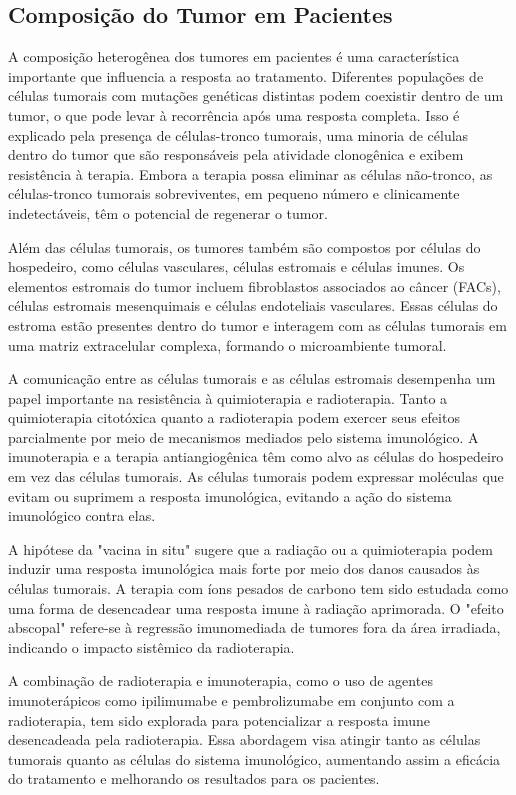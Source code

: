 \documentclass[11pt,a4paper]{article}
\begin{document}
\subsection*{Composição do Tumor em Pacientes}

	A composição heterogênea dos tumores em pacientes é uma característica importante que influencia a resposta ao tratamento. Diferentes populações de células tumorais com mutações genéticas distintas podem coexistir dentro de um tumor, o que pode levar à recorrência após uma resposta completa. Isso é explicado pela presença de células-tronco tumorais, uma minoria de células dentro do tumor que são responsáveis pela atividade clonogênica e exibem resistência à terapia. Embora a terapia possa eliminar as células não-tronco, as células-tronco tumorais sobreviventes, em pequeno número e clinicamente indetectáveis, têm o potencial de regenerar o tumor.

	Além das células tumorais, os tumores também são compostos por células do hospedeiro, como células vasculares, células estromais e células imunes. Os elementos estromais do tumor incluem fibroblastos associados ao câncer (FACs), células estromais mesenquimais e células endoteliais vasculares. Essas células do estroma estão presentes dentro do tumor e interagem com as células tumorais em uma matriz extracelular complexa, formando o microambiente tumoral.

	A comunicação entre as células tumorais e as células estromais desempenha um papel importante na resistência à quimioterapia e radioterapia. Tanto a quimioterapia citotóxica quanto a radioterapia podem exercer seus efeitos parcialmente por meio de mecanismos mediados pelo sistema imunológico. A imunoterapia e a terapia antiangiogênica têm como alvo as células do hospedeiro em vez das células tumorais. As células tumorais podem expressar moléculas que evitam ou suprimem a resposta imunológica, evitando a ação do sistema imunológico contra elas.

	A hipótese da "vacina in situ" sugere que a radiação ou a quimioterapia podem induzir uma resposta imunológica mais forte por meio dos danos causados às células tumorais. A terapia com íons pesados de carbono tem sido estudada como uma forma de desencadear uma resposta imune à radiação aprimorada. O "efeito abscopal" refere-se à regressão imunomediada de tumores fora da área irradiada, indicando o impacto sistêmico da radioterapia.

	A combinação de radioterapia e imunoterapia, como o uso de agentes imunoterápicos como ipilimumabe e pembrolizumabe em conjunto com a radioterapia, tem sido explorada para potencializar a resposta imune desencadeada pela radioterapia. Essa abordagem visa atingir tanto as células tumorais quanto as células do sistema imunológico, aumentando assim a eficácia do tratamento e melhorando os resultados para os pacientes.
\end{document}
